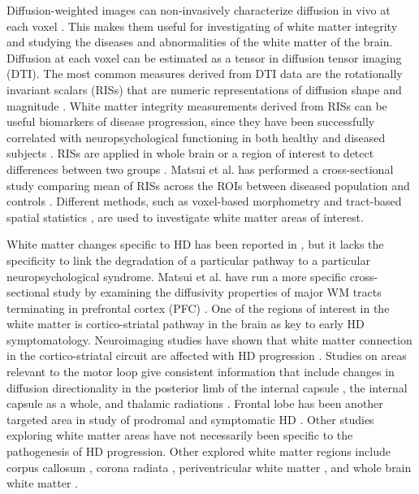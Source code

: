 \noindent Diffusion-weighted images can non-invasively characterize diffusion in vivo at each voxel \cite{Basser2002}. This makes them useful for investigating of white matter integrity and studying the diseases and abnormalities of the white matter of the brain. Diffusion at each voxel can be estimated as a tensor in diffusion tensor imaging (DTI). The most common measures derived from DTI data are the rotationally invariant scalars (RISs) that are numeric representations of diffusion shape and magnitude \cite{Basser1996}. White matter integrity measurements derived from RISs can be useful biomarkers of disease progression, since they have been successfully correlated with neuropsychological functioning in both healthy and diseased subjects \cite{Chua2009}.
\newline
\newline
\noindent RISs are applied in whole brain or a region of interest to detect differences between two groups \cite{Snook2007}. Matsui et al. has performed a cross-sectional study comparing mean of RISs across the ROIs between diseased population and controls \cite{Matsui2014}. Different methods, such as voxel-based morphometry \cite{Ashburner2000} and tract-based spatial statistics \cite{Smith2006}, are used to investigate white matter areas of interest.
\newline

\noindent White matter changes specific to HD has been reported in \cite{Douaud2009}, but it lacks the specificity to link the degradation of a particular pathway to a particular neuropsychological syndrome. Matsui et al. have run a more specific cross-sectional study by examining the diffusivity properties of major WM tracts terminating in prefrontal cortex (PFC) \cite{Matsui2014}.
One of the regions of interest in the white matter is cortico-striatal pathway in the brain as key to early HD symptomatology. Neuroimaging studies have shown that white matter connection in the cortico-striatal circuit are affected with HD progression
\cite{Weaver2009, Beglinger2005, Douaud2009}. Studies on areas relevant to the motor loop give consistent information that include changes in diffusion directionality in the posterior limb of the internal capsule \cite{Rosas2006, DellaNave2010}, the internal capsule as a whole, and thalamic radiations \cite{Stoffers2010, Bohanna2011}. Frontal lobe has been another targeted area in study of prodromal and symptomatic HD \cite{Reading2005, Rosas2006, DellaNave2010}. Other studies exploring white matter areas have not necessarily been specific to the pathogenesis of HD progression. Other explored white matter regions include corpus callosum \cite{Rosas2006, DellaNave2010, Stoffers2010, Bohanna2011, Weaver2009, Sritharan2010, Muller2011, DiPaola2012, Dumas2012}, corona radiata \cite{DellaNave2010, Stoffers2010, Bohanna2011, Weaver2009}, periventricular white matter \cite{Mascalchi2004}, and whole brain white matter \cite{Rosas2006, Mascalchi2004}.
\newline